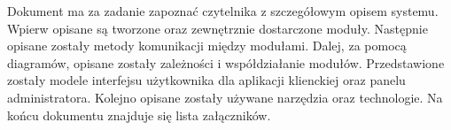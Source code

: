 \documentclass[../deliverable-two.tex]{subfiles}
\begin{document}

\abstract
Dokument ma za zadanie zapoznać czytelnika z szczegółowym opisem systemu.
Wpierw opisane są tworzone oraz zewnętrznie dostarczone moduły.
Następnie opisane zostały metody komunikacji między modułami.
Dalej, za pomocą diagramów, opisane zostały zależności i współdziałanie modułów.
Przedstawione zostały modele interfejsu użytkownika dla aplikacji klienckiej oraz panelu administratora.
Kolejno opisane zostały używane narzędzia oraz technologie.
Na końcu dokumentu znajduje się lista załączników.

\begin{Revisions}
\end{Revisions}

\tableofcontents
\end{document}
